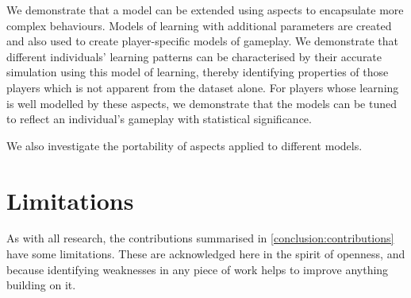 We demonstrate that a model can be extended using aspects to encapsulate more
complex behaviours. Models of learning with additional parameters are created
and also used to create player-specific models of gameplay. We demonstrate that
different individuals' learning patterns can be characterised by their accurate
simulation using this model of learning, thereby identifying properties of those
players which is not apparent from the dataset alone. For players whose learning
is well modelled by these aspects, we demonstrate that the models can be tuned
to reflect an individual's gameplay with statistical significance.

We also investigate the portability of aspects applied to different models.



\section{Limitations}

As with all research, the contributions summarised in
\cref{conclusion:contributions} have some limitations. These are acknowledged
here in the spirit of openness, and because identifying weaknesses in any piece
of work helps to improve anything building on it.

